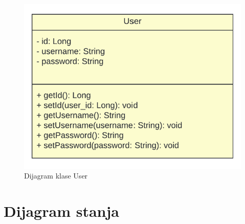 		   \begin{figure}[H]
				\includegraphics[width=\textwidth]{slike/DijagramKlaseUser.png} 
				\caption{Dijagram klase User} 
	   		\end{figure}
			
			
			
			
			
			\eject
		
		\section{Dijagram stanja}
			
			
			
